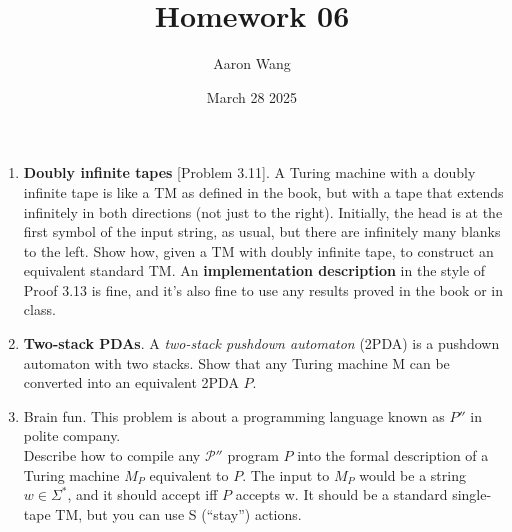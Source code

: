 \documentclass{article}
\title{Homework 06}
\author{Aaron Wang}
\date{March 28 2025}
\newcommand{\s}{\Sigma}
\newcommand{\newp}{\\[2mm]}
\begin{document}
\maketitle
\begin{enumerate}
    \item \textbf{Doubly infinite tapes} [Problem 3.11]. A Turing machine with a doubly infinite tape is like a TM as defined in the book, but with a tape that extends infinitely in both directions (not just to the right). Initially, the head is at the first symbol of the input string, as usual, but there are infinitely many blanks to the left. Show how, given a TM with doubly infinite tape, to construct an equivalent standard TM. An \textbf{implementation description} in the style of Proof 3.13 is fine, and it’s also fine to use any results proved in the book or in class. \newp
    
%
    \item \textbf{Two-stack PDAs}. A \emph{two-stack pushdown automaton} (2PDA) is a pushdown automaton with two stacks. Show that any Turing machine M can be converted into an equivalent 2PDA $P$.\newp
    
    \newpage
    \item Brain fun. This problem is about a programming language known as $P''$ in polite company. \newp
    Describe how to compile any $\mathcal{P}''$ program $P$ into the formal description of a Turing machine $M_P$ equivalent to $P$. The input to $M_P$ would be a string $w \in \s^*$, and it should accept iff $P$ accepts w. It should be a standard single-tape TM, but you can use S (“stay”) actions.\newp
        

\end{enumerate}
\end{document}
